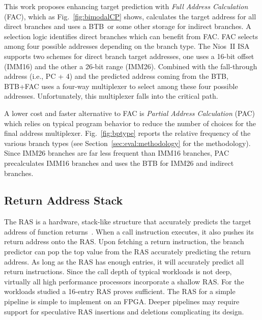 This work proposes enhancing target prediction with \textit{Full Address Calculation} (FAC), which as Fig.~\ref{fig:bimodalCP} shows, calculates the target address for all direct branches and uses a BTB\ or some other storage for indirect branches. A selection logic identifies direct branches which can benefit from FAC. FAC selects among four possible addresses depending on the branch type. The Nios~II ISA supports two schemes for direct branch target addresses, one uses a 16-bit offset (IMM16) and the other a 26-bit range (IMM26). Combined with the fall-through address (i.e., PC + 4) and the predicted address coming from the BTB, BTB+FAC uses a four-way multiplexer to select among these four possible addresses. Unfortunately, this multiplexer falls into the critical path. 

A lower cost and faster alternative to FAC is \textit{Partial Address Calculation} (PAC) which relies on typical program behavior to reduce the number of choices for the final address multiplexer. Fig.~\ref{fig:bptype} reports the relative frequency of the various branch types (see Section~\ref{sec:eval:methodology} for the methodology). Since IMM26 branches are far less frequent than IMM16 branches, PAC precalculates IMM16 branches and uses the BTB for IMM26 and indirect branches.


\subsection{Return Address Stack}
\label{sec:min:target:ras}
The RAS is a hardware, stack-like structure that accurately predicts the target address of function returns~\cite{ras}. When a call instruction executes, it also pushes its return address  onto the RAS. Upon fetching a return instruction, the branch predictor can pop the top value from the RAS  accurately predicting the return address. As long as the RAS has enough entries, it will accurately predict all return instructions. Since the call depth of typical workloads is not deep, virtually all high performance processors incorporate a shallow RAS. For the workloads studied a 16-entry RAS proves sufficient. The RAS for a simple pipeline is simple to implement on an FPGA. Deeper pipelines may require support for speculative RAS insertions and deletions complicating its design. 



